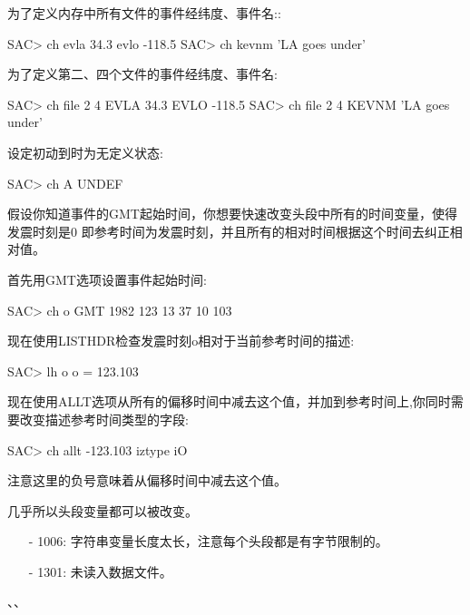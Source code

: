 为了定义内存中所有文件的事件经纬度、事件名::
\begin{SACCode}
SAC> ch evla 34.3 evlo -118.5
SAC> ch kevnm 'LA goes under'
\end{SACCode}

为了定义第二、四个文件的事件经纬度、事件名:
\begin{SACCode}
SAC> ch file 2 4 EVLA 34.3 EVLO -118.5
SAC> ch file 2 4 KEVNM 'LA goes under'
\end{SACCode}

设定初动到时为无定义状态:
\begin{SACCode}
SAC> ch A UNDEF
\end{SACCode}

假设你知道事件的GMT起始时间，你想要快速改变头段中所有的时间变量，使得发震时刻是0
即参考时间为发震时刻，并且所有的相对时间根据这个时间去纠正相对值。

首先用GMT选项设置事件起始时间:
\begin{SACCode}
SAC> ch o GMT 1982 123 13 37 10 103
\end{SACCode}
现在使用LISTHDR检查发震时刻o相对于当前参考时间的描述:
\begin{SACCode}
SAC> lh o
 o = 123.103
\end{SACCode}
现在使用ALLT选项从所有的偏移时间中减去这个值，并加到参考时间上,你同时需要改变描述参考时间类型的字段:
\begin{SACCode}
SAC> ch allt -123.103 iztype iO
\end{SACCode}
注意这里的负号意味着从偏移时间中减去这个值。

几乎所以头段变量都可以被改变。

\begin{itemize}
\item[-]1006: 字符串变量长度太长，注意每个头段都是有字节限制的。
\item[-]1301: 未读入数据文件。
\end{itemize}

、、

